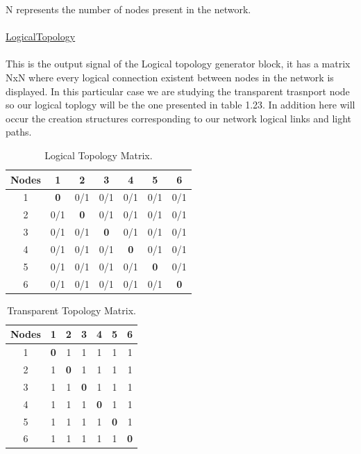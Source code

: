 N represents the number of nodes present in the network.\\ \\
\underline{LogicalTopology}\\
\\
This is the output signal of the Logical topology generator block, it has a matrix NxN where every logical connection existent between nodes in the network is displayed. In this particular case we are studying the transparent trasnport node so our logical toplogy will be the one presented in table 1.23. In addition here will occur the creation structures corresponding to our network logical links and light paths.\\

\begin{table}[H]
	\centering	
	\begin{tabular}{|c|c|c|c|c|c|c|}
		\hline
		\multicolumn{1}{|l|}{Nodes} & 1   & 2   & 3   & 4   & 5   & 6   \\ \hline
		1                           & \textbf{0}   & 0/1 & 0/1 & 0/1 & 0/1 & 0/1 \\ \hline
		2                           & 0/1 & \textbf{0}   & 0/1 & 0/1 & 0/1 & 0/1 \\ \hline
		3                           & 0/1 & 0/1 & \textbf{0}   & 0/1 & 0/1 & 0/1 \\ \hline
		4                           & 0/1 & 0/1 & 0/1 & \textbf{0}   & 0/1 & 0/1 \\ \hline
		5                           & 0/1 & 0/1 & 0/1 & 0/1 & \textbf{0}   & 0/1 \\ \hline
		6                           & 0/1 & 0/1 & 0/1 & 0/1 & 0/1 & \textbf{0}   \\ \hline
	\end{tabular}
	\caption{Logical Topology Matrix.}
	\label{logical_topology}
\end{table}
\begin{table}[H]
	\centering	
	\begin{tabular}{|c|c|c|c|c|c|c|}
		\hline
		\multicolumn{1}{|l|}{Nodes} & 1   & 2   & 3   & 4   & 5   & 6  \\ \hline
		1                           & \textbf{0}   & 1 & 1 & 1 & 1 & 1 \\ \hline
		2                           & 1 & \textbf{0}   & 1 & 1 & 1 & 1 \\ \hline
		3                           & 1 & 1 & \textbf{0}   & 1 & 1 & 1 \\ \hline
		4                           & 1 & 1 & 1 & \textbf{0}   & 1 & 1 \\ \hline
		5                           & 1 & 1 & 1 & 1 & \textbf{0}   & 1 \\ \hline
		6                           & 1 & 1 & 1 & 1 & 1 & \textbf{0}   \\ \hline
	\end{tabular}
	\caption{Transparent Topology Matrix.}
	\label{Transparentlogical_topology}
\end{table}

